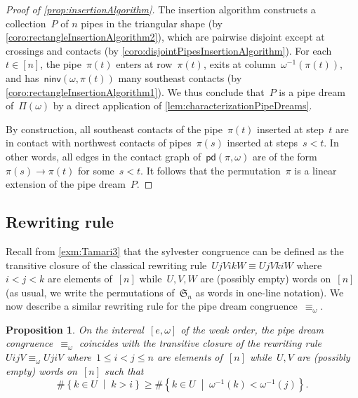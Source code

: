 \documentclass[reqno]{amsart}
\newtheorem{proposition}[theorem]{Proposition}
\theoremstyle{definition}
\newcommand{\set}[2]{\left\{ #1 \;\middle|\; #2 \right\}} %
\newcommand{\fS}{\mathfrak{S}} %
\newcommand{\pipeDreams}{\Pi} %
\newcommand{\noninversions}[2]{\mathsf{ninv}(#1,#2)} %
\newcommand{\insertion}[2]{\mathsf{pd}(#1,#2)} %
\begin{document}
\begin{proof}[Proof of \cref{prop:insertionAlgorithm}]
The insertion algorithm constructs a collection~$P$ of $n$ pipes in the triangular shape (by \cref{coro:rectangleInsertionAlgorithm2}), which are pairwise disjoint except at crossings and contacts (by \cref{coro:disjointPipesInsertionAlgorithm}).
For each~$t \in [n]$, the pipe~$\pi(t)$ enters at row~$\pi(t)$, exits at column~$\omega^{-1}(\pi(t))$, and has~$\noninversions{\omega}{\pi(t)}$ many southeast contacts (by \cref{coro:rectangleInsertionAlgorithm1}).
We thus conclude that~$P$ is a pipe dream of~$\pipeDreams(\omega)$ by a direct application of \cref{lem:characterizationPipeDreams}.

By construction, all southeast contacts of the pipe~$\pi(t)$ inserted at step~$t$ are in contact with northwest contacts of pipes~$\pi(s)$ inserted at steps~$s < t$.
In other words, all edges in the contact graph of~$\insertion{\pi}{\omega}$ are of the form~$\pi(s) \to \pi(t)$ for some~$s < t$.
It follows that the permutation~$\pi$ is a linear extension of the pipe dream~$P$.
\end{proof}


\subsection{Rewriting rule}
\label{subsec:rewritingRule}

Recall from \cref{exm:Tamari3} that the sylvester congruence can be defined as the transitive closure of the classical rewriting rule~$UjVikW \equiv UjVkiW$ where~$i < j < k$ are elements of~$[n]$ while~$U, V, W$ are (possibly empty) words on~$[n]$ (as usual, we write the permutations of~$\fS_n$ as words in one-line notation).
We now describe a similar rewriting rule for the pipe dream congruence~$\equiv_\omega$.

\begin{proposition}
\label{prop:rewritingRule}
On the interval~$[e,\omega]$ of the weak order, the pipe dream congruence~$\equiv_\omega$ coincides with the transitive closure of the rewriting rule~$U ij V \equiv_\omega U ji V$ where~$1 \le i < j \le n$ are elements of~$[n]$ while~$U, V$ are (possibly empty) words on~$[n]$ such that
\[
\# \set{k \in U}{k > i} \ge \# \set{k \in U}{\omega^{-1}(k) < \omega^{-1}(j)}.
\]
\end{proposition}
\end{document}
